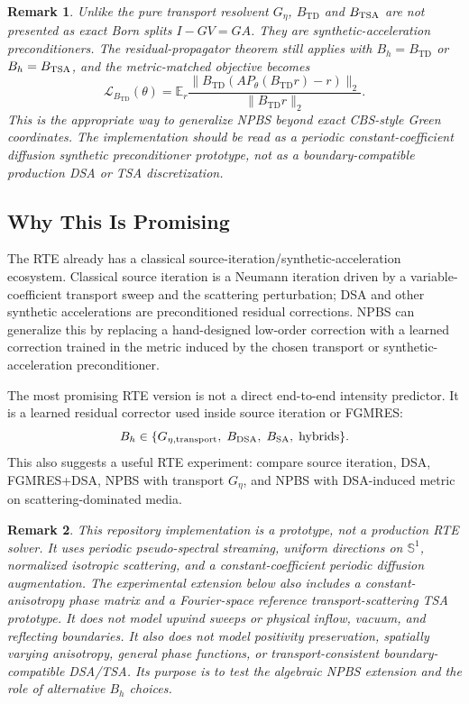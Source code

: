 \documentclass[11pt]{article}
\newtheorem{remark}{Remark}
\begin{document}
\begin{remark}
Unlike the pure transport resolvent \(G_\eta\), \(B_{\mathrm{TD}}\) and
\(B_{\rm TSA}\) are not presented as exact Born splits \(I-GV=GA\).  They are
synthetic-acceleration preconditioners.  The residual-propagator theorem still
applies with \(B_h=B_{\mathrm{TD}}\) or \(B_h=B_{\rm TSA}\), and the
metric-matched objective becomes
\[
  \mathcal{L}_{B_{\mathrm{TD}}}(\theta)
  =
  \mathbb{E}_{r}
  \frac{
    \|B_{\mathrm{TD}}(A P_\theta(B_{\mathrm{TD}}r)-r)\|_2
  }{
    \|B_{\mathrm{TD}}r\|_2
  }.
\]
This is the appropriate way to generalize NPBS beyond exact CBS-style Green
coordinates.  The implementation should be read as a periodic
constant-coefficient diffusion synthetic preconditioner prototype, not as a
boundary-compatible production DSA or TSA discretization.
\end{remark}

\subsection{Why This Is Promising}

The RTE already has a classical source-iteration/synthetic-acceleration
ecosystem. Classical source iteration is a Neumann iteration driven by a
variable-coefficient transport sweep and the scattering perturbation; DSA and
other synthetic accelerations are preconditioned residual corrections. NPBS can
generalize this by replacing a hand-designed low-order correction with a
learned correction trained in the metric induced by the chosen transport or
synthetic-acceleration preconditioner.

The most promising RTE version is not a direct end-to-end intensity predictor.
It is a learned residual corrector used inside source iteration or FGMRES:
\[
  B_h \in \{G_{\eta,\mathrm{transport}},\; B_{\mathrm{DSA}},\;
  B_{\mathrm{SA}},\; \hbox{hybrids}\}.
\]
This also suggests a useful RTE experiment: compare source iteration, DSA,
FGMRES+DSA, NPBS with transport \(G_\eta\), and NPBS with DSA-induced metric on
scattering-dominated media.

\begin{remark}
This repository implementation is a prototype, not a production RTE solver. It
uses periodic pseudo-spectral streaming, uniform directions on
\(\mathbb{S}^1\), normalized isotropic scattering, and a constant-coefficient
periodic diffusion augmentation. The experimental extension below also includes
a constant-anisotropy phase matrix and a Fourier-space reference
transport-scattering TSA prototype. It does not model upwind sweeps or physical
inflow, vacuum, and reflecting boundaries. It also does not model positivity
preservation, spatially varying anisotropy, general phase functions, or
transport-consistent boundary-compatible DSA/TSA. Its purpose is to test the
algebraic NPBS extension and the role of alternative \(B_h\) choices.
\end{remark}
\end{document}
